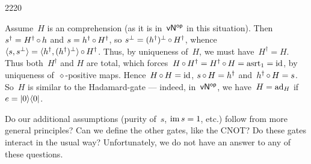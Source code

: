\begin{parsec}{2220}
\begin{point}{10}
\begin{point}{30}
Assume~$H$ is an comprehension (as it is in~${\mathsf{vN}}{^{\mathsf{op}}}$ in this situation).
    Then~$s^\dagger = H^\dagger \mathop{\circ} h$ and
        $s = h^\dagger \mathop{\circ} H^\dagger$,
        so $s^\perp = (h^\dagger)^\perp \mathop{\circ} H^\dagger$,
        whence~$\langle s,s^\perp \rangle = \langle
                h^\dagger, (h^\dagger)^\perp \rangle \mathop{\circ} H^\dagger$.
Thus, by uniqueness of~$H$, we must have~$H^\dagger = H$.
Thus both~$H^\dagger$ and $H$ are total,
    which forces~$H\mathop{\circ} H^\dagger = H^\dagger \mathop{\circ} H = \mathrm{asrt}_{1} = \mathrm{id}$,
    by uniqueness of~$\diamond$-positive maps.
Hence~$H \mathop{\circ} H = \mathrm{id}$,
    $s \mathop{\circ} H = h^\dagger$
    and~$h^\dagger \mathop{\circ} H = s$.
    So~$H$ is similar to the Hadamard-gate
        --- indeed, in~${\mathsf{vN}}{^{\mathsf{op}}}$, we have~$H = \mathrm{ad}_H$ if~$e = \left|0\right>\!\left<0\right|$.
\end{point}
\begin{point}{40}%
Do our additional assumptions (purity of~$s$, $\operatorname{im} s = 1$, etc.)
follow from more general principles?  Can we define the other gates, like
    the CNOT? Do these gates interact in the usual way?
    Unfortunately, we do not have an answer to any of these questions.
\end{point}
\end{point}
\end{parsec}

